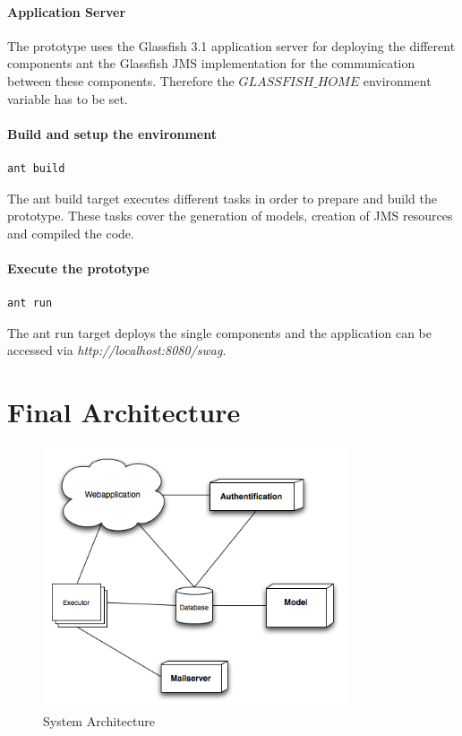 \documentclass[a4paper]{article}
\begin{document}
\paragraph{Application Server}
The prototype uses the Glassfish 3.1 application server for deploying the different components ant the Glassfish JMS implementation for the communication between these components. Therefore the $GLASSFISH\_HOME$ environment variable has to be set.

\paragraph{Build and setup the environment}
\begin{verbatim}
ant build
\end{verbatim}

The ant build target executes different tasks in order to prepare and build the prototype. These tasks cover the generation of models, creation of JMS resources and compiled the code. 



\paragraph{Execute the prototype}
\begin{verbatim}
ant run
\end{verbatim}

The ant run target deploys the single components and the application can be accessed via \emph{http://localhost:8080/swag}.



\section{Final Architecture}

\begin{figure}[htb]
\begin{center}
\leavevmode
\includegraphics[width=0.8\textwidth]{Arch.png}
\end{center}
\caption{System Architecture}

\end{figure}
\end{document}
